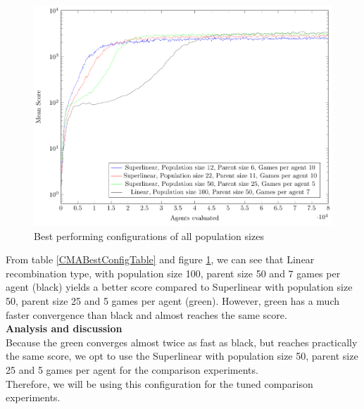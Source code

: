 \begin{figure}[H]
\centering
\includegraphics[scale=0.8]{data/cma_population_offspring/bestofall_population/PlotFile.pdf}
\caption{Best performing configurations of all population sizes \label{CMABestConfigPlot}}
\end{figure}

From table \ref{CMABestConfigTable} and figure \ref{CMABestConfigPlot}, we can see that
Linear recombination type, with population size 100, parent size 50 and 7 games per agent
(black) yields a better score compared to Superlinear with population size 50, parent size 25 and 5 games per agent (green).
However, green has a much faster convergence than black and almost reaches the same score.\\

\textbf{Analysis and discussion}\\
Because the green converges almost twice as fast as black, but reaches practically the same
score, we opt to use the Superlinear with population size 50, parent size 25 and 5 games per agent for the comparison experiments.\\
Therefore, we will be using this configuration for the tuned comparison experiments.








